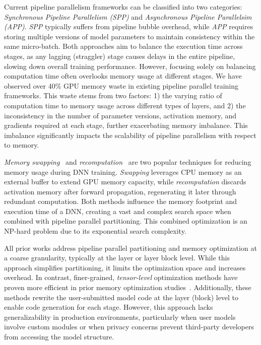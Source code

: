 Current pipeline parallelism frameworks can be classified into two categories:
\emph{Synchronous Pipeline Parallelism (SPP)} and \emph{Asynchronous Pipeline Parallelsim (APP)}.
\emph{SPP} typically suffers from pipeline bubble overhead,
while \emph{APP} requires storing multiple versions of model parameters
to maintain consistency within the same micro-batch.
Both approaches aim to balance the execution time across stages,
as any lagging (straggler) stage causes delays in the entire pipeline,
slowing down overall training performance.
However, focusing solely on balancing computation time often overlooks memory usage at different stages.
We have observed over 40\% GPU memory waste in existing pipeline parallel training frameworks.
This waste stems from two factors: 1) the varying ratio of computation time to memory usage across different types of layers,
and 2) the inconsistency in the number of parameter versions, activation memory, and gradients required at each stage,
further exacerbating memory imbalance.
This imbalance significantly impacts the scalability of pipeline parallelism with respect to memory.

\emph{Memory swapping}~\cite{rhuVDNNVirtualizedDeep2016,jinLayerCentricMemoryReuse2018,wangSuperneuronsDynamicGPU2018,huangSwapAdvisorPushingDeep2020,renSentinelEfficientTensor2021}
and \emph{recomputation}~\cite{chenTrainingDeepNets2016,kirisameDynamicTensorRematerialization,heHOMEHolisticGPU2022,korthikantiReducingActivationRecomputation2023}
are two popular techniques for reducing memory usage during DNN training.
\emph{Swapping} leverages CPU memory as an external buffer to extend GPU memory capacity,
while \emph{recomputation} discards activation memory after forward propagation,
regenerating it later through redundant computation.
Both methods influence the memory footprint and execution time of a DNN,
creating a vast and complex search space when combined with pipeline parallel partitioning.
This combined optimization is an NP-hard problem due to its exponential search complexity.

All prior works address pipeline parallel partitioning and memory optimization at a coarse granularity,
typically at the layer or layer block level.
While this approach simplifies partitioning, it limits the optimization space and increases overhead.
In contrast, finer-grained, \emph{tensor-level} optimization methods have proven
more efficient in prior memory optimization studies~\cite{pengCapuchinTensorbasedGPU2020,zhangTENSILETensorGranularity2022,nieTSPLITFinegrainedGPU2022}.
Additionally, these methods rewrite the user-submitted model code at the layer (block)
level to enable code generation for each stage.
However, this approach lacks generalizability in production environments,
particularly when user models involve custom modules or when privacy concerns
prevent third-party developers from accessing the model structure.

